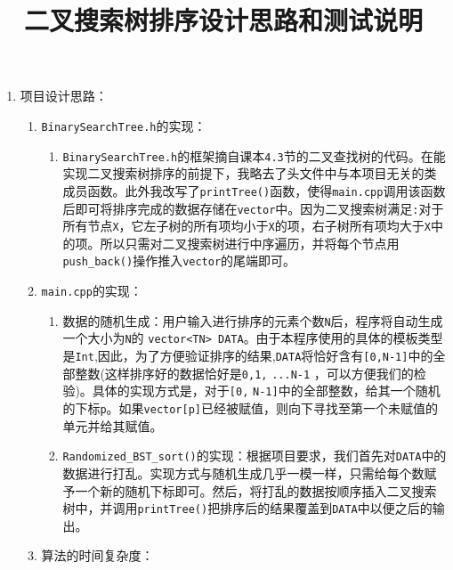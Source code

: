 \documentclass[a4paper,12pt]{article}
\begin{document}
\title{\hei 二叉搜索树排序设计思路和测试说明}


\maketitle


\begin{enumerate}
\item 项目设计思路：
\begin{enumerate}
    \item \verb|BinarySearchTree.h|的实现：
    \begin{enumerate}
        \item \verb|BinarySearchTree.h|的框架摘自课本\verb|4.3|节的二叉查找树的代码。在能实现二叉搜索树排序的前提下，我略去了头文件中与本项目无关的类成员函数。此外我改写了\verb|printTree()|函数，使得\verb|main.cpp|调用该函数后即可将排序完成的数据存储在\verb|vector|中。因为二叉搜索树满足\verb|:|对于所有节点\verb|X|，它左子树的所有项均小于\verb|X|的项，右子树所有项均大于\verb|X|中的项。所以只需对二叉搜索树进行中序遍历，并将每个节点用\verb|push_back()|操作推入\verb|vector|的尾端即可。
    \end{enumerate}
    \item \verb|main.cpp|的实现：
    \begin{enumerate}
        \item {\hei 数据的随机生成}：用户输入进行排序的元素个数\verb|N|后，程序将自动生成一个大小为\verb|N|的 \verb|vector<TN> DATA|。由于本程序使用的具体的模板类型是\verb|Int|,因此，为了方便验证排序的结果,\verb|DATA|将恰好含有\verb|[0,N-1]|中的全部整数(这样排序好的数据恰好是\verb|0,1,|
        \verb|...N-1|
        ，{\hei 可以方便我们的检验})。具体的实现方式是，对于\verb|[0,|
        \verb|N-1]|中的全部整数，给其一个随机的下标\verb|p|。如果\verb|vector[p]|已经被赋值，则向下寻找至第一个未赋值的单元并给其赋值。
        \item {\hei \verb|Randomized_BST_sort()|的实现}：根据项目要求，我们首先对\verb|DATA|中的数据进行打乱。实现方式与随机生成几乎一模一样，只需给每个数赋予一个新的随机下标即可。然后，将打乱的数据按顺序插入二叉搜索树中，并调用\verb|printTree()|把排序后的结果覆盖到\verb|DATA|中以便之后的输出。
    \end{enumerate}
    \item {\hei 算法的时间复杂度}：
    

\end{enumerate}
\end{enumerate}
\end{document}
